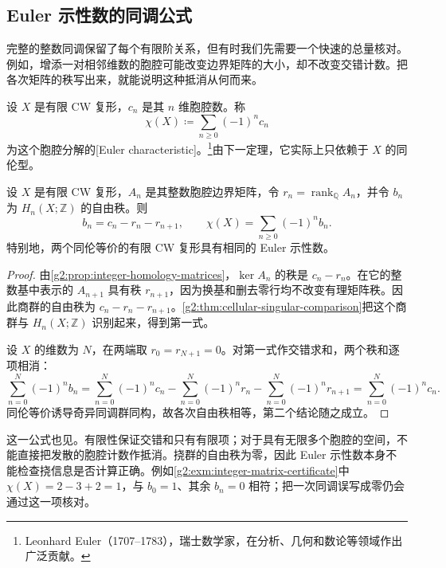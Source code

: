 \subsection{Euler 示性数的同调公式}
\label{g2:subsec:0304:03}

完整的整数同调保留了每个有限阶关系，但有时我们先需要一个快速的总量核对。例如，增添一对相邻维数的胞腔可能改变边界矩阵的大小，却不改变交错计数。把各次矩阵的秩写出来，就能说明这种抵消从何而来。

\begin{definition}\label{g2:def:euler-characteristic}
	设 \(X\) 是有限 CW 复形，\(c_n\) 是其 \(n\) 维胞腔数。称
	\[
		\chi(X)\coloneqq\sum_{n\ge0}(-1)^nc_n
	\]
	为这个胞腔分解的[Euler characteristic]。\footnote{Leonhard Euler（1707--1783），瑞士数学家，在分析、几何和数论等领域作出广泛贡献。}由下一定理，它实际上只依赖于 \(X\) 的同伦型。
\end{definition}

\begin{theorem}\label{g2:thm:euler-homology}
	设 \(X\) 是有限 CW 复形，\(A_n\) 是其整数胞腔边界矩阵，令 \(r_n=\operatorname{rank}_{\mathbb Q}A_n\)，并令 \(b_n\) 为 \(H_n(X;\mathbb Z)\) 的自由秩。则
	\[
		b_n=c_n-r_n-r_{n+1},\qquad
		\chi(X)=\sum_{n\ge0}(-1)^nb_n.
	\]
	特别地，两个同伦等价的有限 CW 复形具有相同的 Euler 示性数。
\end{theorem}
\begin{proof}
	由\cref{g2:prop:integer-homology-matrices}，\(\ker A_n\) 的秩是 \(c_n-r_n\)。在它的整数基中表示的 \(A_{n+1}\) 具有秩 \(r_{n+1}\)，因为换基和删去零行均不改变有理矩阵秩。因此商群的自由秩为 \(c_n-r_n-r_{n+1}\)。\cref{g2:thm:cellular-singular-comparison}把这个商群与 \(H_n(X;\mathbb Z)\) 识别起来，得到第一式。

	设 \(X\) 的维数为 \(N\)，在两端取 \(r_0=r_{N+1}=0\)。对第一式作交错求和，两个秩和逐项相消：
	\[
		\sum_{n=0}^N(-1)^nb_n
		=\sum_{n=0}^N(-1)^nc_n
		-\sum_{n=0}^N(-1)^nr_n
		-\sum_{n=0}^N(-1)^nr_{n+1}
		=\sum_{n=0}^N(-1)^nc_n.
	\]
	同伦等价诱导奇异同调群同构，故各次自由秩相等，第二个结论随之成立。
\end{proof}

这一公式也见\cite[第2.2节，Cellular Homology]{Hatcher2002}。有限性保证交错和只有有限项；对于具有无限多个胞腔的空间，不能直接把发散的胞腔计数作抵消。挠群的自由秩为零，因此 Euler 示性数本身不能检查挠信息是否计算正确。例如\cref{g2:exm:integer-matrix-certificate}中 \(\chi(X)=2-3+2=1\)，与 \(b_0=1\)、其余 \(b_n=0\) 相符；把一次同调误写成零仍会通过这一项核对。

